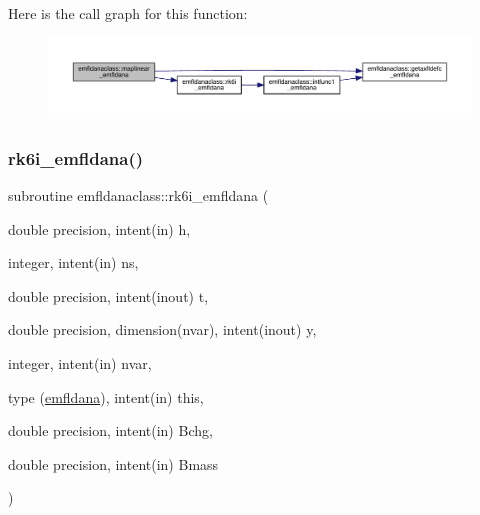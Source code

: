 Here is the call graph for this function\+:\nopagebreak
\begin{figure}[H]
\begin{center}
\leavevmode
\includegraphics[width=350pt]{namespaceemfldanaclass_aabcc1ab7e5ac19f07fba4e38cfe24b04_cgraph}
\end{center}
\end{figure}
\mbox{\label{namespaceemfldanaclass_aed1f8dea5d7871c10eb2835b204dd581}} 
\subsubsection{\texorpdfstring{rk6i\_emfldana()}{rk6i\_emfldana()}}
{\footnotesize\ttfamily subroutine emfldanaclass\+::rk6i\+\_\+emfldana (\begin{DoxyParamCaption}\item[{double precision, intent(in)}]{h,  }\item[{integer, intent(in)}]{ns,  }\item[{double precision, intent(inout)}]{t,  }\item[{double precision, dimension(nvar), intent(inout)}]{y,  }\item[{integer, intent(in)}]{nvar,  }\item[{type (\mbox{\hyperlink{namespaceemfldanaclass_structemfldanaclass_1_1emfldana}{emfldana}}), intent(in)}]{this,  }\item[{double precision, intent(in)}]{Bchg,  }\item[{double precision, intent(in)}]{Bmass }\end{DoxyParamCaption})}

